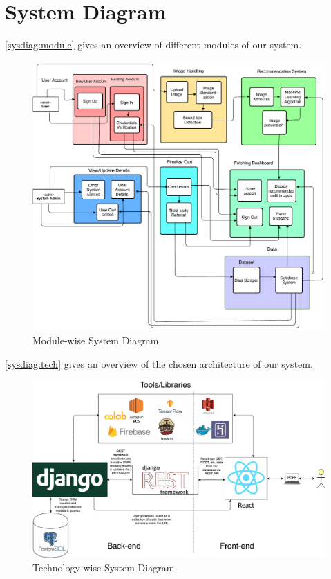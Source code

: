 \section{System Diagram}
\label{srs:sysdiag}
\autoref{sysdiag:module} gives an overview of different modules of our system.
\begin{figure}[H]
\includegraphics[width=15cm]{images/systemDiagramModule.pdf} 
\centering
\caption{Module-wise System Diagram}
\label{sysdiag:module}
\end{figure}
\autoref{sysdiag:tech} gives an overview of the chosen architecture of our system.
\begin{figure}[H]
\includegraphics[width=15cm]{images/systemDiagramTech.pdf} 
\centering
\caption{Technology-wise System Diagram}
\label{sysdiag:tech}
\end{figure}

